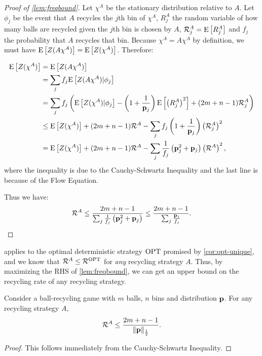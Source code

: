 \begin{proof}[Proof of \cref{lem:freqbound}]
	Let $\chi^A$ be the stationary distribution relative to $A$. Let $\phi_j$
	be the event that $A$ recycles the $j$th bin of $\chi^A$, $R_j^A$ the
	random variable of how many balls are recycled given the $j$th bin is
	chosen by $A$, $\mathcal{R}_j^A=\mathrm{E}\left[R_j^A\right]$ and $f_j$ the probability that
	$A$ recycles that bin.  Because $\chi^A = A\chi^A$ by definition, we must
	have $\mathrm{E}\left[Z(A\chi^A)\right] = \mathrm{E}\left[Z(\chi^A)\right]$. Therefore:

	\begin{align*}
	\mathrm{E}\left[Z(\chi^A)\right] &= \mathrm{E}\left[Z(A\chi^A)\right]\\
	  	      &= \sum_j f_j \mathrm{E}\left[Z(A\chi^A)|\phi_j\right] \\
		      &= \sum_j f_j \left(\mathrm{E}\left[Z(\chi^A)|\phi_j\right] - \left(1+\frac{1}{\mathbf{p}_j}\right)\mathrm{E}\left[\left(R_j^A\right)^2\right] + (2m+n-1)\mathcal{R}_j^A\right) \\
		      &\leq \mathrm{E}\left[Z(\chi^A)\right] + (2m+n-1)\mathcal{R}^A - \sum_j f_j\left(1 +\frac{1}{\mathbf{p}_j}\right)\left(\mathcal{R}_j^A\right)^2 \\
		      &= \mathrm{E}\left[Z(\chi^A)\right] + (2m+n-1)\mathcal{R}^A - \sum_j \frac{1}{f_j}\left(\mathbf{p}_j^2 +\mathbf{p}_j\right)\left(\mathcal{R}^A\right)^2,
	\end{align*}
	where the inequality is due to the Cauchy-Schwartz Inequality and the last
	line is because of the Flow Equation.
	
	Thus we have:
        \[ \mathcal{R}^A \leq \frac{2m+n-1}{\sum_j \frac{1}{f_j}\left(\mathbf{p}_j^2 +\mathbf{p}_j\right)} \leq \frac{2m+n-1}{\sum_j \frac{\mathbf{p}_j}{f_j}}. \]
\end{proof}

 applies to the optimal deterministic strategy $\textrm{OPT}$
promised by \cref{cor:opt-unique}, and we know that $\mathcal{R}^A\leq
\mathcal{R}^{\textrm{OPT}}$ for \textit{any} recycling strategy $A$.  Thus, by maximizing
the RHS of \cref{lem:freqbound}, we can get an upper bound on the recycling
rate of any recycling strategy.

\begin{lemma}\label{lem:upperbound}
	Consider a ball-recycling game with $m$ balls, $n$ bins and distribution
	$\mathbf{p}$. For any recycling strategy $A$, 
	\[\mathcal{R}^A \leq \frac{2m+n-1}{\|\mathbf{p}\|_{\frac{1}{2}}}.\]
\end{lemma}

\begin{proof}
	This follows immediately from the Cauchy-Schwartz Inequality.
\end{proof}

